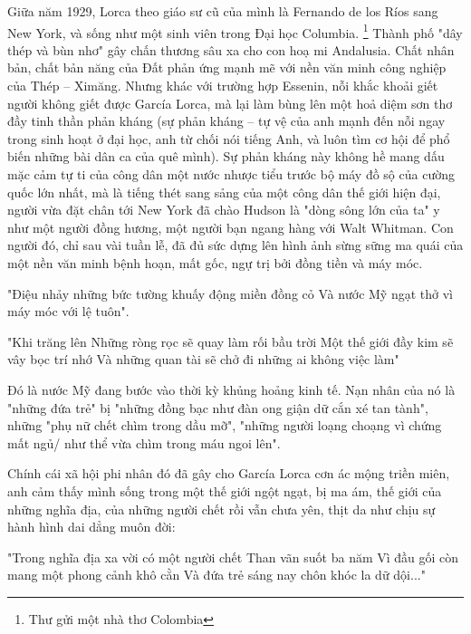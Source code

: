 \documentclass[../main.tex]{subfiles}
\begin{document}
\begin{multicols}{2}
Giữa năm 1929, Lorca theo giáo sư cũ của mình là Fernando de los Ríos sang New York, và sống như một sinh viên trong Đại học Columbia. \footnote{
Thư gửi một nhà thơ Colombia}  Thành phố "dây thép và bùn nhơ" gây chấn thương sâu xa cho con hoạ mi Andalusia. Chất nhân bản, chất bản năng của Đất phản ứng mạnh mẽ với nền văn minh công nghiệp của Thép – Ximăng. Nhưng khác với trường hợp Essenin, nỗi khắc khoải giết người không giết được García Lorca, mà lại làm bùng lên một hoả diệm sơn thơ đầy tinh thần phản kháng (sự phản kháng – tự vệ của anh mạnh đến nỗi ngay trong sinh hoạt ở đại học, anh từ chối nói tiếng Anh, và luôn tìm cơ hội để phổ biến những bài dân ca của quê mình). Sự phản kháng này không hề mang dấu mặc cảm tự ti của công dân một nước nhược tiểu trước bộ máy đồ sộ của cường quốc lớn nhất, mà là tiếng thét sang sảng của một công dân thế giới hiện đại, người vừa đặt chân tới New York đã chào Hudson là "dòng sông lớn của ta" y như một người đồng hương, một người bạn ngang hàng với Walt Whitman. Con người đó, chỉ sau vài tuần lễ, đã đủ sức dựng lên hình ảnh sừng sững ma quái của một nền văn minh bệnh hoạn, mất gốc, ngự trị bởi đồng tiền và máy móc. 
\begin{blockquote}
        
"Điệu nhảy những bức tường khuấy động miền đồng cỏ        
Và nước Mỹ ngạt thở vì máy móc với lệ tuôn". 
         
"Khi trăng lên        
Những ròng rọc sẽ quay làm rối bầu trời        
Một thế giới đầy kim sẽ vây bọc trí nhớ        
Và những quan tài sẽ chở đi những ai không việc làm" 

\end{blockquote}
 
Đó là nước Mỹ đang bước vào thời kỳ khủng hoảng kinh tế. Nạn nhân của nó là "những đứa trẻ" bị "những đồng bạc như đàn ong giận dữ cắn xé tan tành", những "phụ nữ chết chìm trong dầu mỡ", "những người loạng choạng vì chứng mất ngủ/ như thể vừa chìm trong máu ngoi lên". 
 
Chính cái xã hội phi nhân đó đã gây cho García Lorca cơn ác mộng triền miên, anh cảm thấy mình sống trong một thế giới ngột ngạt, bị ma ám, thế giới của những nghĩa địa, của những người chết rồi vẫn chưa yên, thịt da như chịu sự hành hình dai dẳng muôn đời: 
\begin{blockquote}
        
"Trong nghĩa địa xa vời có một người chết         
Than vãn suốt ba năm        
Vì đầu gối còn mang một phong cảnh khô cằn        
Và đứa trẻ sáng nay chôn khóc la dữ dội..." 


\end{blockquote}
\end{multicols}
\end{document}
